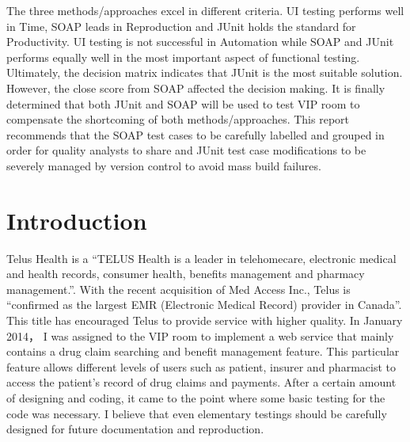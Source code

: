 \documentclass[12pt]{article}
\begin{document}
The three methods/approaches excel in different criteria. UI testing performs well in Time, SOAP leads in Reproduction and JUnit holds the standard for Productivity. UI testing is not successful in Automation while SOAP and JUnit performs equally well in the most important aspect of functional testing.\\

Ultimately, the decision matrix indicates that JUnit is the most suitable solution. However, the close score from SOAP affected the decision making. It is finally determined that both JUnit and SOAP will be used to test VIP room to compensate the shortcoming of both methods/approaches. This report recommends that the SOAP test cases to be carefully labelled and grouped in order for quality analysts to share and JUnit test case modifications to be severely managed by version control to avoid mass build failures.\\



\newpage

\tableofcontents
\newpage
\listoffigures
\newpage
\listoftables
\newpage


\section{Introduction}

Telus Health is a “TELUS Health is a leader in telehomecare, electronic medical and health records, consumer health, benefits management and pharmacy management.”\cite{telusComp}. With the recent acquisition of Med Access Inc., Telus is “confirmed as the largest EMR (Electronic Medical Record) provider in Canada”\cite{telusComp}. This title has encouraged Telus to provide service with higher quality. In January 2014， I was assigned to the VIP room to implement a web service that mainly contains a drug claim searching and benefit management feature. This particular feature allows different levels of users such as patient, insurer and pharmacist to access the patient's record of drug claims and payments. After a certain amount of designing and coding, it came to the point where some basic testing for the code was necessary. I believe that even elementary testings should be carefully designed for future documentation and reproduction. \\
\end{document}
